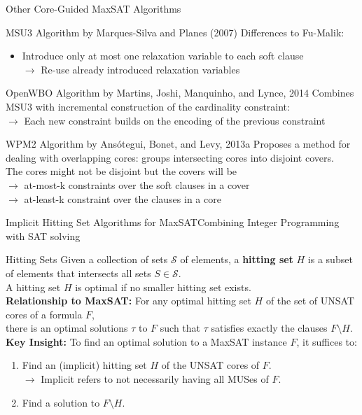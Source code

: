 \documentclass[t,english]{sdqbeamer}
\begin{document}
\begin{frame}{Other Core-Guided MaxSAT Algorithms}
\vspace{-2em}
\begin{block}{MSU3 Algorithm by Marques-Silva and Planes (2007)}
Differences to Fu-Malik:
\begin{itemize}
	\item Introduce only at most one relaxation variable to each soft clause\\
	$\rightarrow$ Re-use already introduced relaxation variables
\end{itemize}
\end{block}
\begin{block}{OpenWBO Algorithm by Martins, Joshi, Manquinho, and Lynce, 2014}
Combines MSU3 with incremental construction of the cardinality constraint:\\
$\rightarrow$ Each new constraint builds on the encoding of the previous constraint
\end{block}
\begin{block}{WPM2 Algorithm by Ansótegui, Bonet, and Levy, 2013a}
Proposes a method for dealing with overlapping cores: groups intersecting cores into disjoint covers.\\
The cores might not be disjoint but the covers will be\\
$\rightarrow$ at-most-k constraints over the soft clauses in a cover\\
$\rightarrow$ at-least-k constraint over the clauses in a core
\end{block}
\end{frame}

\begin{frame}{Implicit Hitting Set Algorithms for MaxSAT}{Combining Integer Programming with SAT solving}
\begin{block}{Hitting Sets}
Given a collection of sets $\mathcal{S}$ of elements, a \textbf{hitting set} $H$ is a subset of elements that intersects all sets $S \in \mathcal{S}$.\\
A hitting set $H$ is optimal if no smaller hitting set exists.\\[1em]
\textbf{Relationship to MaxSAT:}
For any optimal hitting set $H$ of the set of UNSAT cores of a formula $F$,\\
there is an optimal solutions $\tau$ to $F$ such that $\tau$ satisfies exactly the clauses $F \setminus H$.\\[1em]
\textbf{Key Insight:}
To find an optimal solution to a MaxSAT instance $F$, it suffices to:\\[1ex]
\begin{enumerate}
	\item Find an (implicit) hitting set $H$ of the UNSAT cores of $F$.\\
	$\rightarrow$ Implicit refers to not necessarily having all MUSes of $F$.
	\item Find a solution to $F \setminus H$.
\end{enumerate}
\end{block}
\end{frame}
\end{document}
